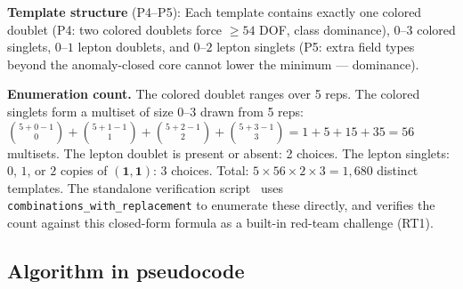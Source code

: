 \documentclass[11pt]{article}
\theoremstyle{definition}
\begin{document}
\smallskip\noindent\textbf{Template structure} (P4--P5):
Each template contains exactly one colored doublet (P4: two colored
doublets force $\ge 54$ DOF, class dominance), $0$--$3$ colored
singlets, $0$--$1$
lepton doublets, and $0$--$2$ lepton singlets (P5: extra field types
beyond the anomaly-closed core cannot lower the minimum ---
dominance).

\smallskip\noindent\textbf{Enumeration count.}\quad
The colored doublet ranges over 5 reps.  The colored singlets form a
multiset of size $0$--$3$ drawn from 5 reps: $\binom{5+0-1}{0} +
\binom{5+1-1}{1} + \binom{5+2-1}{2} + \binom{5+3-1}{3} = 1 + 5 + 15
+ 35 = 56$ multisets.  The lepton doublet is present or absent: 2
choices.  The lepton singlets: $0$, $1$, or $2$ copies of
$(\mathbf{1},\mathbf{1})$: 3 choices.  Total:
$5 \times 56 \times 2 \times 3 = 1{,}680$ distinct templates.
The standalone verification script~\cite{BrookeFermionScan}
uses \texttt{combinations\_with\_replacement} to enumerate these
directly, and verifies the count against this closed-form formula
as a built-in red-team challenge (RT1).

\subsection{Algorithm in pseudocode}
\label{app:pseudocode}
\end{document}
